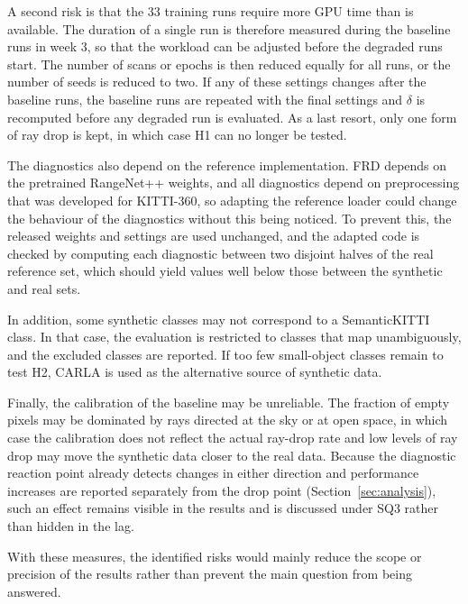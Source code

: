 A second risk is that the 33 training runs require more GPU time than is available. The duration of a single run is therefore measured during the baseline runs in week 3, so that the workload can be adjusted before the degraded runs start. The number of scans or epochs is then reduced equally for all runs, or the number of seeds is reduced to two. If any of these settings changes after the baseline runs, the baseline runs are repeated with the final settings and $\delta$ is recomputed before any degraded run is evaluated. As a last resort, only one form of ray drop is kept, in which case H1 can no longer be tested.

The diagnostics also depend on the reference implementation. FRD depends on the pretrained RangeNet++ weights, and all diagnostics depend on preprocessing that was developed for KITTI-360, so adapting the reference loader could change the behaviour of the diagnostics without this being noticed. To prevent this, the released weights and settings are used unchanged, and the adapted code is checked by computing each diagnostic between two disjoint halves of the real reference set, which should yield values well below those between the synthetic and real sets.

In addition, some synthetic classes may not correspond to a SemanticKITTI class. In that case, the evaluation is restricted to classes that map unambiguously, and the excluded classes are reported. If too few small-object classes remain to test H2, CARLA is used as the alternative source of synthetic data.

Finally, the calibration of the baseline may be unreliable. The fraction of empty pixels may be dominated by rays directed at the sky or at open space, in which case the calibration does not reflect the actual ray-drop rate and low levels of ray drop may move the synthetic data closer to the real data. Because the diagnostic reaction point already detects changes in either direction and performance increases are reported separately from the drop point (Section~\ref{sec:analysis}), such an effect remains visible in the results and is discussed under SQ3 rather than hidden in the lag.

With these measures, the identified risks would mainly reduce the scope or precision of the results rather than prevent the main question from being answered.